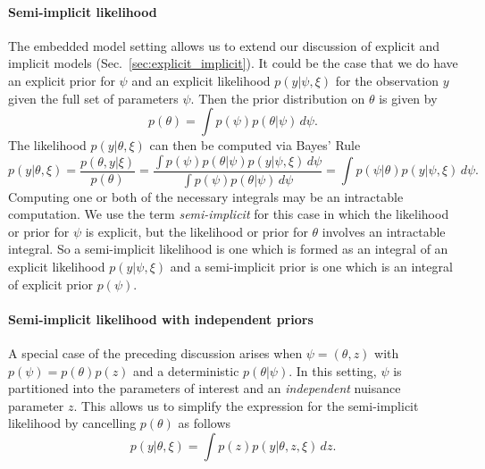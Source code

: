 \documentclass[a4paper, 10pt]{report}
\theoremstyle{plain}
\begin{document}
	\paragraph{Semi-implicit likelihood}
	The embedded model setting allows us to extend our discussion of explicit and implicit models (Sec.~\ref{sec:explicit_implicit}).
	It could be the case that we do have an explicit prior for $\psi$ and an explicit likelihood $p(y|\psi,\xi)$ for the observation $y$ given the full set of parameters $\psi$.
	Then the prior distribution on $\theta$ is given by
	\begin{equation}
		\label{eq:semi_implicit_prior}
		p(\theta) = \int p(\psi)p(\theta|\psi)\,d\psi.
	\end{equation}
	The likelihood $p(y|\theta,\xi)$ can then be computed via Bayes' Rule
	\begin{equation}
	\label{eq:qoi}
		p(y|\theta,\xi) = \frac{p(\theta,y|\xi)}{p(\theta)} = \frac{\int p(\psi)p(\theta|\psi)p(y|\psi,\xi)\,d\psi}{\int p(\psi)p(\theta|\psi)\,d\psi} = \int p(\psi|\theta)p(y|\psi,\xi)\, d\psi.
	\end{equation}
	Computing one or both of the necessary integrals may be an intractable computation.
	We use the term \emph{semi-implicit} for this case in which the likelihood or prior for $\psi$ is explicit, but the likelihood or prior for $\theta$ involves an intractable integral.
	So a semi-implicit likelihood is one which is formed as an integral of an explicit likelihood $p(y|\psi,\xi)$ and a semi-implicit prior is one which is an integral of explicit prior $p(\psi)$.
	
	\paragraph{Semi-implicit likelihood with independent priors}
	A special case of the preceding discussion arises when $\psi=(\theta,z)$ with $p(\psi) = p(\theta)p(z)$ and a deterministic $p(\theta|\psi)$. In this setting, $\psi$ is partitioned into the parameters of interest and an \emph{independent} nuisance parameter $z$. This allows us to simplify the expression for the semi-implicit likelihood by cancelling $p(\theta)$ as follows
	\begin{equation}
	\label{eq:indep_prior_semi_implicit}
		p(y|\theta,\xi) = \int p(z)p(y|\theta,z,\xi)\, dz.
	\end{equation}
	
	
\end{document}
